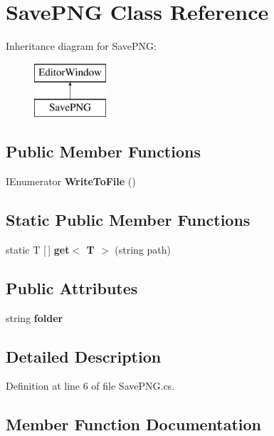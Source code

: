 \section{Save\+P\+NG Class Reference}
\label{class_save_p_n_g}
Inheritance diagram for Save\+P\+NG\+:\begin{figure}[H]
\begin{center}
\leavevmode
\includegraphics[height=2.000000cm]{class_save_p_n_g}
\end{center}
\end{figure}
\subsection*{Public Member Functions}
\begin{DoxyCompactItemize}
\item 
I\+Enumerator \textbf{ Write\+To\+File} ()
\end{DoxyCompactItemize}
\subsection*{Static Public Member Functions}
\begin{DoxyCompactItemize}
\item 
static T [$\,$] \textbf{ get$<$ T $>$} (string path)
\end{DoxyCompactItemize}
\subsection*{Public Attributes}
\begin{DoxyCompactItemize}
\item 
string \textbf{ folder}
\end{DoxyCompactItemize}


\subsection{Detailed Description}


Definition at line 6 of file Save\+P\+N\+G.\+cs.



\subsection{Member Function Documentation}
\mbox{\label{class_save_p_n_g_a6ea58748ddde3b27074b7c95650649da}} 
